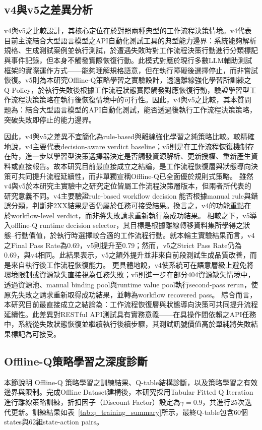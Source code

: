 \begin{ZhChapter}
\subsection{v4與v5之差異分析}
\text v4與v5之比較設計，其核心定位在於對照兩種典型的工作流程決策情境。v4代表目前主流結合大型語言模型之API自動化測試工具的典型能力邊界：系統能夠解析規格、生成測試案例並執行測試，於遭遇失敗時對工作流程決策行動進行分類標記與事件記錄，但本身不觸發實際恢復行動。此模式對應於現行多數LLM輔助測試框架的實際運作方式——能夠理解規格語意，但在執行障礙後選擇停止，而非嘗試恢復。v5則為本研究Offline-Q策略學習之實驗設計，透過離線強化學習所訓練之Q-Policy，於執行失敗後根據工作流程狀態實際觸發對應恢復行動，驗證學習型工作流程決策策略在執行後恢復情境中的可行性。因此，v4與v5之比較，其本質問題為：結合大型語言模型的API自動化測試，能否透過後執行工作流程決策策略，突破失敗即停止的能力邊界。

\text 因此，v4與v5之差異不宜簡化為rule-based與離線強化學習之純策略比較。較精確地說，v4主要代表decision-aware verdict baseline；v5則是在工作流程恢復機制存在時，進一步以學習型決策選擇器決定是否觸發資源解析、更新授權、重新產生資料或直接報告。故本研究目前最直接成立之結論，是工作流程恢復層與狀態導向決策可共同提升流程延續性，而非單獨宣稱Offline-Q已全面優於規則式策略。
\text 雖然v4與v5於本研究主實驗中之研究定位皆屬工作流程決策層版本，但兩者所代表的研究意義不同。v4主要驗證rule-based workflow decision 能否根據manual rule與錯誤分類，判斷非2XX結果是否仍屬於任務可接受結果。換言之，v4的功能重點在於workflow-level verdict，而非將失敗請求重新執行為成功結果。
\text 相較之下，v5導入offline-Q runtime decision selector，其目標是根據離線轉移資料集所學得之狀態--行動價值，於執行時選擇較合適的工作流程行動。就本輪主實驗結果而言，v4之Final Pass Rate為0.69，v5則提升至0.79；然而，v5之Strict Pass Rate仍為0.69，與v4相同。此結果表示，v5之額外提升並非來自前段測試生成品質改善，而是來自執行後工作流程恢復能力。
\text 更具體地說，v4使系統可在語意層級上避免將環境限制或資源缺失直接視為任務失敗；v5則進一步在部分404資源缺失情境中，透過資源池、manual binding pool與runtime value pool執行second-pass rerun，使原先失敗之請求重新取得成功結果，並轉為workflow recovered pass。
\text 綜合而言，本研究目前最直接成立之結論為：工作流程恢復層與狀態導向決策可共同提升流程延續性。此差異對RESTful API測試具有實務意義——在具操作間依賴之API任務中，系統從失敗狀態恢復並繼續執行後續步驟，其測試訊號價值高於單純將失敗結果標記為可接受。

\clearpage
\subsection{Offline-Q策略學習之深度診斷}
\text 本節說明 Offline-Q 策略學習之訓練結果、Q-table結構診斷，以及策略學習之有效邊界與限制。完成Offline Dataset建構後，本研究採用Tabular Fitted Q Iteration進行離線策略訓練，折扣因子（Discount Factor）設定為$\gamma=0.9$，共進行25次迭代更新。訓練結果如表~\ref{tab:q_training_summary}所示，最終Q-table包含60個states與62組state-action pairs。


\end{ZhChapter}
